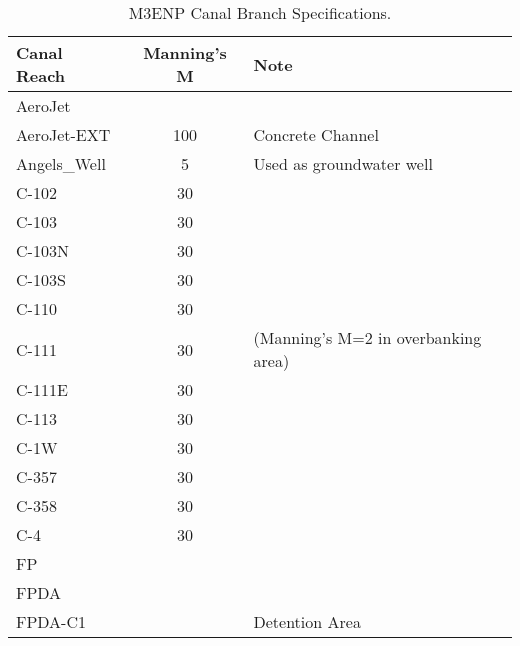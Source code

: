 \begin{table}[!h]
\caption{M3ENP Canal Branch Specifications.}
\label{tab:canals}
\begin{tabular}{lcl}
\hline
Canal Reach        & Manning's M  & Note                                        \\
\hline
AeroJet            &              &                                             \\
AeroJet-EXT        & 100          & Concrete Channel                        \\
Angels\_Well       & 5            & Used as groundwater well                    \\
C-102              & 30           &                                             \\
C-103              & 30           &                                             \\
C-103N             & 30           &                                             \\
C-103S             & 30           &                                             \\
C-110              & 30           &                                             \\
C-111              & 30           & (Manning's M=2 in overbanking area)         \\
C-111E             & 30           &                                             \\
C-113              & 30           &                                             \\
C-1W               & 30           &                                             \\
C-357              & 30           &                                             \\
C-358              & 30           &                                             \\
C-4                & 30           &                                             \\
FP                 &              &                                             \\
FPDA               &              &                                             \\
FPDA-C1            &              & Detention Area                              \\

\end{tabular}
\end{table}
